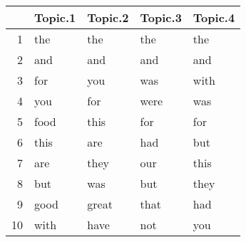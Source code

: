 \begin{tabular}{rllll}
  \hline
 & Topic.1 & Topic.2 & Topic.3 & Topic.4 \\ 
  \hline
1 & the & the & the & the \\ 
  2 & and & and & and & and \\ 
  3 & for & you & was & with \\ 
  4 & you & for & were & was \\ 
  5 & food & this & for & for \\ 
  6 & this & are & had & but \\ 
  7 & are & they & our & this \\ 
  8 & but & was & but & they \\ 
  9 & good & great & that & had \\ 
  10 & with & have & not & you \\ 
   \hline
\end{tabular}
